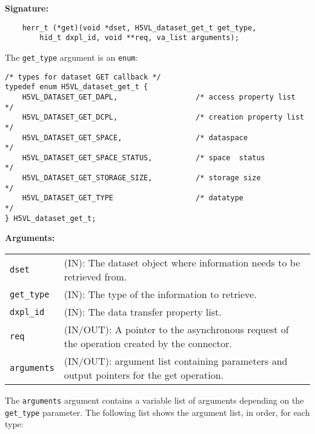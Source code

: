 \begin{mdframed}[style=bgbox]
\textbf{Signature:}
\begin{lstlisting}
    herr_t (*get)(void *dset, H5VL_dataset_get_t get_type, 
        hid_t dxpl_id, void **req, va_list arguments);
\end{lstlisting}

The \texttt{get\_type} argument is an \texttt{enum}:
\begin{lstlisting}
/* types for dataset GET callback */
typedef enum H5VL_dataset_get_t {                                                
    H5VL_DATASET_GET_DAPL,                  /* access property list                */
    H5VL_DATASET_GET_DCPL,                  /* creation property list              */
    H5VL_DATASET_GET_SPACE,                 /* dataspace                           */
    H5VL_DATASET_GET_SPACE_STATUS,          /* space  status                       */
    H5VL_DATASET_GET_STORAGE_SIZE,          /* storage size                        */
    H5VL_DATASET_GET_TYPE                   /* datatype                            */
} H5VL_dataset_get_t; 
\end{lstlisting}

\textbf{Arguments:}\\
\begin{tabular}{l p{13.5cm}}
  \texttt{dset} & (IN): The dataset object where information needs to be
  retrieved from.\\
  \texttt{get\_type} & (IN): The type of the information to retrieve.\\
  \texttt{dxpl\_id} & (IN): The data transfer property list.\\
  \texttt{req} & (IN/OUT): A pointer to the asynchronous request of the
  operation created by the connector.\\
  \texttt{arguments} & (IN/OUT): argument list containing parameters and
  output pointers for the get operation. \\
\end{tabular}
\end{mdframed}

The \texttt{arguments} argument contains a variable list of arguments
depending on the \texttt{get\_type} parameter. The following list shows
the argument list, in order, for each type:

